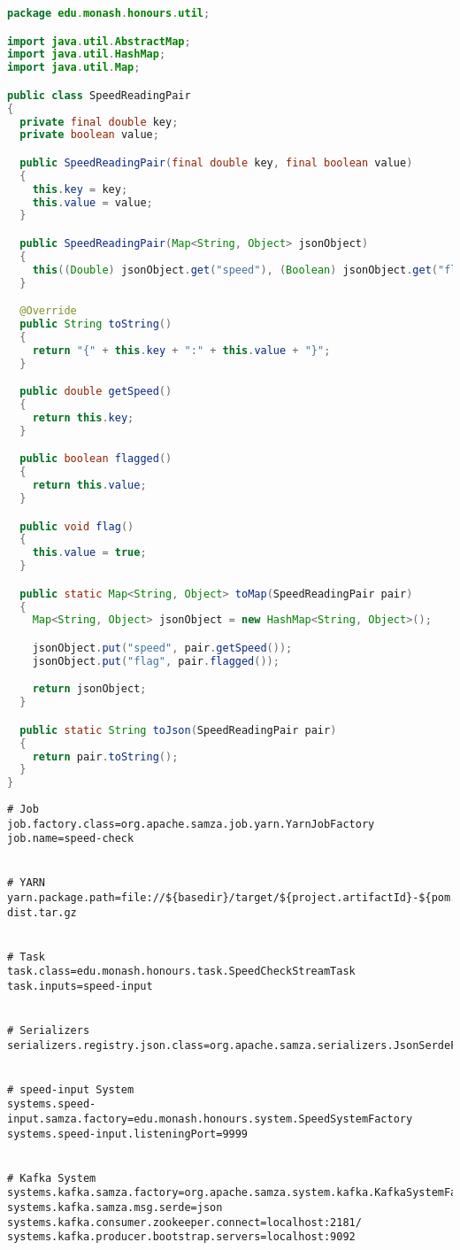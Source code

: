 \clearpage
\begin{lstlisting}[language=java,caption=edu.monash.honours.util.SpeedReadingPair (Java),label=samza-util]
package edu.monash.honours.util;

import java.util.AbstractMap;
import java.util.HashMap;
import java.util.Map;

public class SpeedReadingPair
{
  private final double key;
  private boolean value;

  public SpeedReadingPair(final double key, final boolean value)
  {
    this.key = key;
    this.value = value;
  }

  public SpeedReadingPair(Map<String, Object> jsonObject)
  {
    this((Double) jsonObject.get("speed"), (Boolean) jsonObject.get("flag"));
  }

  @Override
  public String toString()
  {
    return "{" + this.key + ":" + this.value + "}";
  }

  public double getSpeed()
  {
    return this.key;
  }

  public boolean flagged()
  {
    return this.value;
  }

  public void flag()
  {
    this.value = true;
  }

  public static Map<String, Object> toMap(SpeedReadingPair pair)
  {
    Map<String, Object> jsonObject = new HashMap<String, Object>();

    jsonObject.put("speed", pair.getSpeed());
    jsonObject.put("flag", pair.flagged());

    return jsonObject;
  }

  public static String toJson(SpeedReadingPair pair)
  {
    return pair.toString();
  }
}
\end{lstlisting}

\clearpage
\begin{lstlisting}[caption=SpeedCheckStreamTask (Samza config),label=samza-config]
# Job
job.factory.class=org.apache.samza.job.yarn.YarnJobFactory
job.name=speed-check


# YARN
yarn.package.path=file://${basedir}/target/${project.artifactId}-${pom.version}-dist.tar.gz


# Task
task.class=edu.monash.honours.task.SpeedCheckStreamTask
task.inputs=speed-input


# Serializers
serializers.registry.json.class=org.apache.samza.serializers.JsonSerdeFactory


# speed-input System
systems.speed-input.samza.factory=edu.monash.honours.system.SpeedSystemFactory
systems.speed-input.listeningPort=9999


# Kafka System
systems.kafka.samza.factory=org.apache.samza.system.kafka.KafkaSystemFactory
systems.kafka.samza.msg.serde=json
systems.kafka.consumer.zookeeper.connect=localhost:2181/
systems.kafka.producer.bootstrap.servers=localhost:9092
\end{lstlisting}


